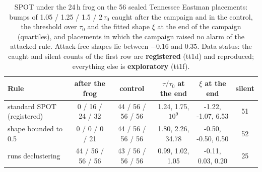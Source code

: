 \documentclass[sigconf]{acmart}
\begin{document}
\begin{table}[t]
\caption{SPOT under the 24\,h frog on the 56 sealed Tennessee Eastman placements: bumps of 1.05 / 1.25 /
1.5 / 2\,$\tau_0$ caught after the campaign and in the control, the threshold over $\tau_0$ and the fitted
shape $\xi$ at the end of the campaign (quartiles), and placements in which the campaign raised no alarm
of the attacked rule. Attack-free shapes lie between $-0.16$ and $0.35$. Data status: the caught and silent
counts of the first row are \textbf{registered} (tt1d) and reproduced; everything else is \textbf{exploratory}
(tt1f).}
\label{tab:spotfrog}
\small
\begin{tabularx}{\textwidth}{@{}Lccccc@{}}
\toprule
Rule & after the frog & control & $\tau/\tau_0$ at the end & $\xi$ at the end & silent \\
\midrule
standard SPOT (registered) & 0 / 16 / 24 / 32 & 44 / 56 / 56 / 56 & 1.24, 1.75, $10^{9}$ & -1.22, -1.07, 6.53 & 51 \\
shape bounded to 0.5 & 0 / 0 / 0 / 21 & 44 / 56 / 56 / 56 & 1.80, 2.26, 34.78 & -0.50, -0.50, 0.50 & 52 \\
runs declustering & 44 / 56 / 56 / 56 & 43 / 56 / 56 / 56 & 0.99, 1.02, 1.05 & -0.11, 0.03, 0.20 & 25 \\
\bottomrule
\end{tabularx}
\end{table}
\end{document}
